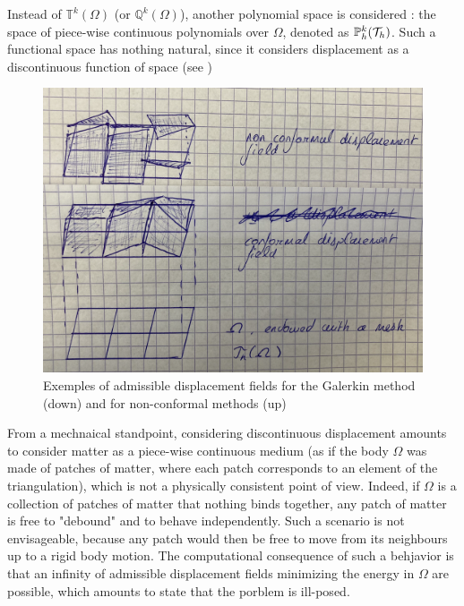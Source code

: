 \documentclass[fleqn]{article}
\begin{document}
            Instead of $\mathbb{T}^k(\Omega)$ (or $\mathbb{Q}^k(\Omega)$), another polynomial space is considered : the space of piece-wise continuous polynomials over $\Omega$, denoted as $\mathbb{P}_h^k(\mathcal{T}_h)$. Such a functional space has nothing natural, since it considers displacement as a discontinuous function of space (see )

            \begin{figure}[h]
                \centering
                \includegraphics[width=10.cm]{img/discontinuous_displacement.png}
                \caption{Exemples of admissible displacement fields for the Galerkin method (down) and for non-conformal methods (up)}
                \label{fig_discontinuous_displacement}
            \end{figure}

            From a mechnaical standpoint, considering discontinuous displacement amounts to consider matter as a piece-wise continuous medium (as if the body $\Omega$ was made of patches of matter, where each patch corresponds to an element of the triangulation), which is not a physically consistent point of view.
            \newline
            Indeed, if $\Omega$ is a collection of patches of matter that nothing binds together, any patch of matter is free to "debound" and to behave independently. Such a scenario is not envisageable, because any patch would then be free to move from its neighbours up to a rigid body motion. The computational consequence of such a behjavior is that an infinity of admissible displacement fields minimizing the energy in $\Omega$ are possible, which amounts to state that the porblem is ill-posed.
\end{document}
